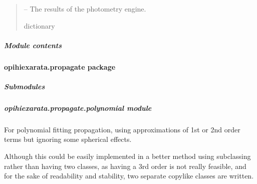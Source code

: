 \documentclass[letterpaper,11pt,english]{sphinxmanual}
\begin{document}
\begin{savenotes}
\begin{fulllineitems}
\begin{quote}
\begin{description}
\begin{itemize}
\end{itemize}

\sphinxAtStartPar
{} – The results of the photometry engine.

\sphinxAtStartPar
dictionary

\end{description}\end{quote}

\end{fulllineitems}\end{savenotes}



\subparagraph{Module contents}
\label{\detokenize{code/opihiexarata.photometry:module-opihiexarata.photometry}}\label{\detokenize{code/opihiexarata.photometry:module-contents}}
\sphinxstepscope


\paragraph{opihiexarata.propagate package}
\label{\detokenize{code/opihiexarata.propagate:opihiexarata-propagate-package}}\label{\detokenize{code/opihiexarata.propagate::doc}}

\subparagraph{Submodules}
\label{\detokenize{code/opihiexarata.propagate:submodules}}
\sphinxstepscope


\subparagraph{opihiexarata.propagate.polynomial module}
\label{\detokenize{code/opihiexarata.propagate.polynomial:module-opihiexarata.propagate.polynomial}}\label{\detokenize{code/opihiexarata.propagate.polynomial:opihiexarata-propagate-polynomial-module}}\label{\detokenize{code/opihiexarata.propagate.polynomial::doc}}
\sphinxAtStartPar
For polynomial fitting propagation, using approximations of 1st or 2nd order
terms but ignoring some spherical effects.

\sphinxAtStartPar
Although this could be easily implemented in a better method using subclassing
rather than having two classes, as having a 3rd order is not really feasible,
and for the sake of readability and stability, two separate copy\sphinxhyphen{}like classes
are written.
\end{document}

